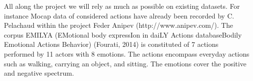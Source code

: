 % 

All along the project we will rely as much as possible on existing datasets. For instance Mocap data of considered actions have already been recorded by C. Pelachaud within the project Feder Anipev (http://www.anipev.com/). 
The corpus EMILYA (EMotional body expressIon in daiLY Actions databaseBodily Emotional Actions Behavior) (Fourati, 2014) is constituted of 7 actions performed by 11 actors with 8 emotions. The actions encompass everyday actions such as walking, carrying an object, and sitting. 
The emotions cover the positive and negative spectrum. 


\endinput